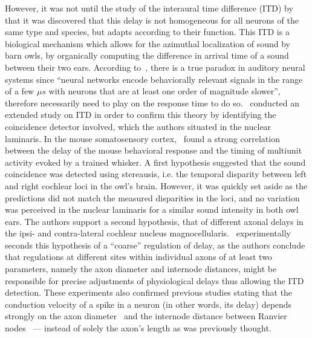 \documentclass[brainsci, %
               review,submit,pdftex,moreauthors
               ]{Definitions/mdpi}
\begin{document}
However, it was not until the study of the interaural time difference (ITD) by~\citet{gerstner_neuronal_1996} that it was discovered that this delay is not homogeneous for all neurons of the same type and species, but adapts according to their function. This ITD is a biological mechanism which allows for the azimuthal localization of sound by barn owls, by organically computing the difference in arrival time of a sound between their two ears. According to~\citep{gerstner_neuronal_1996}, there is a true paradox in auditory neural systems since ``neural networks encode behaviorally relevant signals in the range of a few $\mu s$ with neurons that are at least one order of magnitude slower'', therefore necessarily need to play on the response time to do so.~\citet{pena_cochlear_2001} conducted an extended study on ITD in order to confirm this theory by identifying the coincidence detector involved, which the authors situated in the nuclear laminaris. In the mouse somatosensory cortex,~\citep{camon_timing_2019}  found a strong correlation between the delay of the mouse behavioral response and the timing of multiunit activity evoked by a trained whisker. A first hypothesis suggested that the sound coincidence was detected using stereausis, i.e. the temporal disparity between left and right cochlear loci in the owl's brain. However, it was quickly set aside as the predictions did not match the measured disparities in the loci, and no variation was perceived in the nuclear laminaris for a similar sound intensity in both owl ears. The authors support a second hypothesis, that of different axonal delays in the ipsi- and contra-lateral cochlear nucleus magnocellularis.~\citet{seidl_mechanisms_2010} experimentally seconds this hypothesis of a ``coarse'' regulation of delay, as the authors conclude that regulations at different sites within individual axons of at least two parameters, namely the axon diameter and internode distances, might be responsible for precise adjustments of physiological delays thus allowing the ITD detection. These experiments also confirmed previous studies stating that the conduction velocity of a spike in a neuron (in other words, its delay) depends strongly on the axon diameter~\citep{gasser_axon_1939} and the internode distance between Ranvier nodes~\citep{brill_conduction_1977} --- instead of solely the axon's length as was previously thought.

\end{document}
